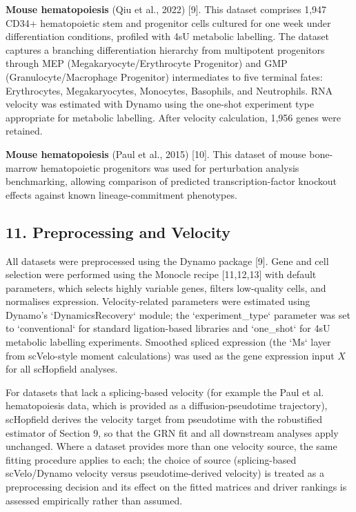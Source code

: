 \documentclass[11pt]{article}
\begin{document}
\textbf{Mouse hematopoiesis} (Qiu et al., 2022) [9]. This dataset comprises 1,947 CD34+ hematopoietic stem and progenitor cells cultured for one week under differentiation conditions, profiled with 4sU metabolic labelling. The dataset captures a branching differentiation hierarchy from multipotent progenitors through MEP (Megakaryocyte/Erythrocyte Progenitor) and GMP (Granulocyte/Macrophage Progenitor) intermediates to five terminal fates: Erythrocytes, Megakaryocytes, Monocytes, Basophils, and Neutrophils. RNA velocity was estimated with Dynamo using the one-shot experiment type appropriate for metabolic labelling. After velocity calculation, 1,956 genes were retained.

\textbf{Mouse hematopoiesis} (Paul et al., 2015) [10]. This dataset of mouse bone-marrow hematopoietic progenitors was used for perturbation analysis benchmarking, allowing comparison of predicted transcription-factor knockout effects against known lineage-commitment phenotypes.



\subsection*{11. Preprocessing and Velocity}

All datasets were preprocessed using the Dynamo package [9]. Gene and cell selection were performed using the Monocle recipe [11,12,13] with default parameters, which selects highly variable genes, filters low-quality cells, and normalises expression. Velocity-related parameters were estimated using Dynamo's `DynamicsRecovery` module; the `experiment\_type` parameter was set to `conventional` for standard ligation-based libraries and `one\_shot` for 4sU metabolic labelling experiments. Smoothed spliced expression (the `Ms` layer from scVelo-style moment calculations) was used as the gene expression input $X$ for all scHopfield analyses.

For datasets that lack a splicing-based velocity (for example the Paul et al. hematopoiesis data, which is provided as a diffusion-pseudotime trajectory), scHopfield derives the velocity target from pseudotime with the robustified estimator of Section 9, so that the GRN fit and all downstream analyses apply unchanged. Where a dataset provides more than one velocity source, the same fitting procedure applies to each; the choice of source (splicing-based scVelo/Dynamo velocity versus pseudotime-derived velocity) is treated as a preprocessing decision and its effect on the fitted matrices and driver rankings is assessed empirically rather than assumed.
\end{document}
